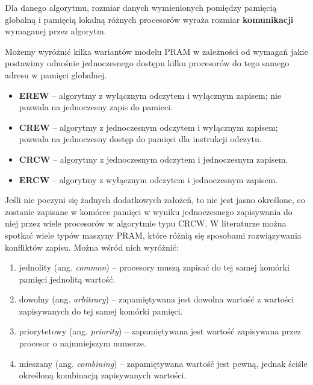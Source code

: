 Dla danego algorytmu, rozmiar danych wymienionych pomiędzy pamięcią globalną i pamięcią lokalną różnych procesorów wyraża rozmiar \textbf{komunikacji} wymaganej przez algorytm.


Możemy wyróżnić kilka wariantów modelu PRAM w zależności od wymagań jakie postawimy odnośnie jednoczesnego dostępu kilku procesorów do tego samego adresu w pamięci globalnej.\\
\begin{itemize}
\item\textbf{EREW} -- algorytmy z wyłącznym odczytem i wyłącznym zapisem; nie pozwala na jednoczesny zapis do pamieci.
\item\textbf{CREW} -- algorytmy z jednoczesnym odczytem i wyłącznym zapisem; pozwala na jednoczesny  dostęp do pamięci dla instrukcji odczytu.
\item\textbf{CRCW} -- algorytmy z jednoczesnym odczytem i jednoczesnym zapisem.
\item\textbf{ERCW} -- algorytmy z wyłącznym odczytem i jednoczesnym zapisem.
\end{itemize}


Jeśli nie poczyni się żadnych dodatkowych założeń, to nie jest jasno określone, co zostanie zapisane w komórce pamięci w wyniku jednoczesnego zapisywania do niej przez wiele procesorów w algorytmie typu CRCW. W literaturze można spotkać wiele typów maszyny PRAM, które różnią się sposobami rozwiązywania konfliktów zapisu. Można wśród nich wyróżnić\cite{Cormen94}:
\begin{enumerate}
\item jednolity (ang. \emph{common}) – procesory muszą zapisać do tej samej komórki pamięci jednolitą wartość.
\item dowolny (ang. \emph{arbitrary}) – zapamiętywana jest dowolna wartość z wartości zapisywanych do tej samej komórki pamięci.
\item priorytetowy (ang. \emph{priority}) – zapamiętywana jest wartość zapisywana przez procesor o najmniejszym numerze.
\item mieszany (ang. \emph{combining}) – zapamiętywana wartość jest pewną, jednak ściśle określoną kombinacją zapisywanych wartości.
\end{enumerate}

